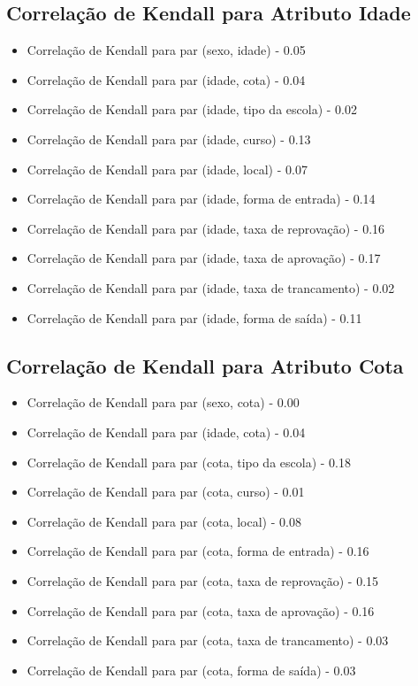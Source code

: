\subsection{Correlação de Kendall para Atributo Idade}
\begin{itemize}
    \item Correlação de Kendall para par (sexo, idade) - 0.05
    \item Correlação de Kendall para par (idade, cota) - 0.04
    \item Correlação de Kendall para par (idade, tipo da escola) - 0.02
    \item Correlação de Kendall para par (idade, curso) - 0.13
    \item Correlação de Kendall para par (idade, local) - 0.07
    \item Correlação de Kendall para par (idade, forma de entrada) - 0.14
    \item Correlação de Kendall para par (idade, taxa de reprovação) - 0.16
    \item Correlação de Kendall para par (idade, taxa de aprovação) - 0.17
    \item Correlação de Kendall para par (idade, taxa de trancamento) - 0.02
    \item Correlação de Kendall para par (idade, forma de saída) - 0.11
\end{itemize}

\subsection{Correlação de Kendall para Atributo Cota}
\begin{itemize}
    \item Correlação de Kendall para par (sexo, cota) - 0.00
    \item Correlação de Kendall para par (idade, cota) - 0.04
    \item Correlação de Kendall para par (cota, tipo da escola) - 0.18
    \item Correlação de Kendall para par (cota, curso) - 0.01
    \item Correlação de Kendall para par (cota, local) - 0.08
    \item Correlação de Kendall para par (cota, forma de entrada) - 0.16
    \item Correlação de Kendall para par (cota, taxa de reprovação) - 0.15
    \item Correlação de Kendall para par (cota, taxa de aprovação) - 0.16
    \item Correlação de Kendall para par (cota, taxa de trancamento) - 0.03
    \item Correlação de Kendall para par (cota, forma de saída) - 0.03
\end{itemize}

